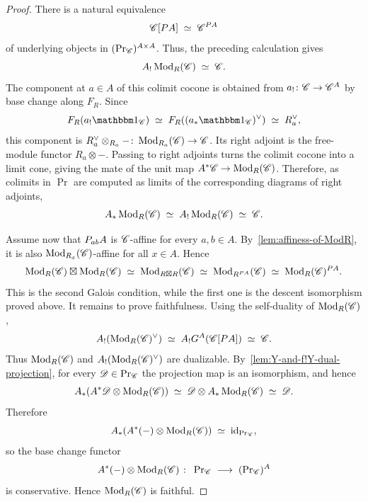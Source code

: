 \documentclass[english,svgnames,table]{article}
\begin{document}
\begin{proof}
        There is a natural equivalence
        \begin{equation*}
            \mathscr{C}[P A] \;\simeq\; \mathscr{C}^{P A}
        \end{equation*}
        of underlying objects in $(\operatorname{Pr}_{\mathscr{C}})^{A\times A}$. Thus, the preceding calculation gives
        \begin{equation*}
            A_!\operatorname{Mod}_R(\mathscr{C}) \;\simeq\; \mathscr{C}.
        \end{equation*}
        The component at $a\in A$ of this colimit cocone is obtained from $a_!\colon\mathscr{C}\to\mathscr{C}^A$ by base change along $F_R$. 
        Since
        \begin{equation*}
            F_R(a_!\ounit_{\cC}) \;\simeq\; F_R((a_*\ounit_{\cC})\dual) \;\simeq\; R_a\dual,
        \end{equation*}
        this component is $R_a^{\vee}\otimes_{R_a}-\colon\operatorname{Mod}_{R_a}(\mathscr{C})\to\mathscr{C}$. Its right adjoint is the free-module functor $R_a\otimes-$. Passing to right adjoints turns the colimit cocone into a limit cone, giving the mate of the unit map $A^*\mathscr{C}\to\operatorname{Mod}_R(\mathscr{C})$. Therefore, as colimits in $\Pr$ are computed as limits of the corresponding diagrams of right adjoints,
        \begin{equation*}
            A_* \operatorname{Mod}_R(\mathscr{C}) \;\simeq\; A_! \operatorname{Mod}_R(\mathscr{C}) \;\simeq\; \mathscr{C}.
        \end{equation*}
        
        Assume now that $P_{ab} A$ is $\mathscr{C}$-affine for every $a,b\in A$. By~\cref{lem:affiness-of-ModR}, it is also $\operatorname{Mod}_{R_x}(\mathscr{C})$-affine for all $x \in A$. Hence
        \begin{equation*}
            \operatorname{Mod}_R(\mathscr{C})\boxtimes\operatorname{Mod}_R(\mathscr{C}) \;\simeq\; \operatorname{Mod}_{R\boxtimes R}(\mathscr{C}) \;\simeq\; \operatorname{Mod}_{R^{P A}}(\mathscr{C})
            \;\simeq\; \operatorname{Mod}_R(\mathscr{C})^{P A}.
        \end{equation*}
        This is the second Galois condition, while the first one is the descent isomorphism proved above. 
        It remains to prove faithfulness.
        Using the self-duality of $\operatorname{Mod}_R(\mathscr{C})$,
        \begin{equation*}
            A_!(\operatorname{Mod}_R(\mathscr{C})^{\vee}) \;\simeq\; A_!G^A(\mathscr{C}[P A]) \;\simeq\; \mathscr{C}.
        \end{equation*}
        Thus $\operatorname{Mod}_R(\mathscr{C})$ and $A_!(\operatorname{Mod}_R(\mathscr{C})^{\vee})$ are dualizable. By~\cref{lem:Y-and-f!Y-dual-projection}, for every $\mathscr{D} \in \operatorname{Pr}_{\mathscr{C}}$ the projection map is an isomorphism, and hence
        \begin{equation*}
            A_*(A^*\mathscr{D} \otimes \operatorname{Mod}_R(\mathscr{C})) \;\simeq\; \mathscr{D} \otimes A_*\operatorname{Mod}_R(\mathscr{C}) \;\simeq\; \mathscr{D}.
        \end{equation*}
        Therefore 
        \begin{equation*}
            A_* (A^*(-) \otimes \operatorname{Mod}_R(\mathscr{C})) \;\simeq\; \mathrm{id}_{\operatorname{Pr}_{\mathscr{C}}},
        \end{equation*}
        so the base change functor
        \begin{equation*}
            A^*(-) \otimes \operatorname{Mod}_R(\mathscr{C}) \;\colon\; \operatorname{Pr}_{\mathscr{C}} \;\longrightarrow\; (\operatorname{Pr}_{\mathscr{C}})^A
        \end{equation*}
        is conservative. Hence $\operatorname{Mod}_R(\mathscr{C})$ is faithful.
    \end{proof}
\end{document}
